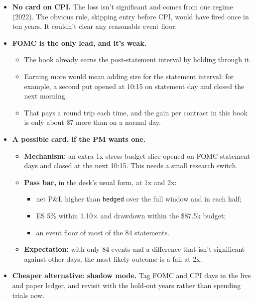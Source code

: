 \documentclass{article}
\begin{document}
\begin{itemize}

\item \textbf{No card on CPI.} The loss isn't significant and comes from one regime (2022). The obvious rule, skipping entry before CPI, would have fired once in ten years. It couldn't clear any reasonable event floor.

\item \textbf{FOMC is the only lead, and it's weak.}

\begin{itemize}

\item The book already earns the post-statement interval by holding through it.

\item Earning more would mean adding size for the statement interval: for example, a second put opened at 10:15 on statement day and closed the next morning.

\item That pays a round trip each time, and the gain per contract in this book is only about \$7 more than on a normal day.

\end{itemize}

\item \textbf{A possible card, if the PM wants one.}

\begin{itemize}

\item \textbf{Mechanism:} an extra 1x stress-budget slice opened on FOMC statement days and closed at the next 10:15. This needs a small research switch.

\item \textbf{Pass bar,} in the desk's usual form, at 1x and 2x:

\begin{itemize}

\item net P\&L higher than \texttt{hedged} over the full window and in each half;

\item ES 5\% within 1.10\ensuremath{\times} and drawdown within the \$87.5k budget;

\item an event floor of most of the 84 statements.

\end{itemize}

\item \textbf{Expectation:} with only 84 events and a difference that isn't significant against other days, the most likely outcome is a fail at 2x.

\end{itemize}

\item \textbf{Cheaper alternative: shadow mode.} Tag FOMC and CPI days in the live and paper ledger, and revisit with the hold-out years rather than spending trials now.

\end{itemize}
\end{document}
